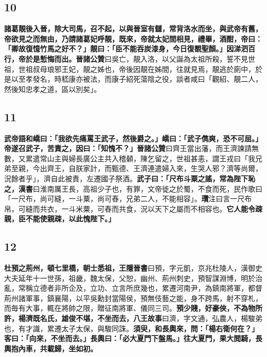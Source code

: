 \subsection*{10}

\textbf{諸葛靚後入晉，除大司馬，召不起，以與晉室有讎，常背洛水而坐，與武帝有舊，帝欲見之而無由，乃請諸葛妃呼靚，既來，帝就太妃間相見，禮畢，酒酣，帝曰：「卿故復憶竹馬之好不？」靚曰：「臣不能吞炭漆身，今日復覩聖顏。」因涕泗百行，帝於是慙悔而出。}{\footnotesize \textbf{晉諸公贊}曰吳亡，靚入洛，以父誕為太祖所殺，誓不見世祖，世祖叔母琅邪王妃，靚之姊也，帝後因靚在姊間，往就見焉，靚逃於廁中，於是以至孝發名，時嵇康亦被法，而康子紹死蕩陰之役，談者咸曰「觀紹、靚二人，然後知忠孝之道，區以別矣」。}

\subsection*{11}

\textbf{武帝語和嶠曰：「我欲先痛罵王武子，然後爵之。」嶠曰：「武子儁爽，恐不可屈。」帝遂召武子，苦責之，因曰：「知愧不？」}{\footnotesize \textbf{晉諸公贊}曰齊王當出藩，而王濟諫請無數，又累遣常山主與婦長廣公主共入稽顙，陳乞留之，世祖甚恚，謂王戎曰「我兄弟至親，今出齊王，自朕家計，而甄德、王濟連遣婦入來，生哭人邪？濟等尚爾，況餘者乎」，濟自此被責，左遷國子祭酒。}\textbf{武子曰：「尺布斗粟之謠，常為陛下恥之，}{\footnotesize \textbf{漢書}曰淮南厲王長，高祖少子也，有罪，文帝徙之於蜀，不食而死，民作歌曰「一尺布，尚可縫，一斗粟，尚可舂，兄弟二人，不能相容」。\textbf{瓚}注曰言一尺布帛，可縫而共衣，一斗米粟，可舂而共食，況以天下之屬而不相容也。}\textbf{它人能令疎親，臣不能使親疎，以此愧陛下。」}

\subsection*{12}

\textbf{杜預之荊州，頓七里橋，朝士悉祖，}{\footnotesize \textbf{王隱晉書}曰預，字元凱，京兆杜陵人，漢御史大夫延年十一世孫，祖畿，魏太保，父恕，幽州、荊州刺史，預智謀淵博，明於治亂，常稱立德者非所企及，立功、立言所庶幾也，累遷河南尹，為鎮南將軍，都督荊州諸軍事，鎮襄陽，以平吳勳封當陽侯，預無伎藝之能，身不跨馬，射不穿札，而毎有大事，輒在將帥之限，贈征南將軍、儀同三司。}\textbf{預少賤，好豪俠，不為物所許，楊濟既名氏，雄俊不堪，不坐而去，}{\footnotesize \textbf{八王故事}曰濟，字文通，弘農人，楊駿弟也，有才識，累遷太子太保，與駿同誅。}\textbf{須臾，和長輿來，問：「楊右衛何在？」客曰：「向來，不坐而去。」長輿曰：「必大夏門下盤馬。」往大夏門，果大閲騎，長輿抱內車，共載歸，坐如初。}

